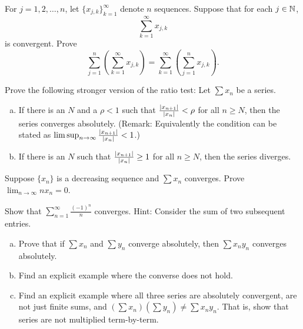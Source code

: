 \begin{exercise}
For $j=1,2,\ldots,n$, let $\{ x_{j,k} \}_{k=1}^\infty$ denote $n$
sequences.  Suppose that for each $j \in {\mathbb{N}}$,
\begin{equation*}
\sum_{k=1}^\infty x_{j,k}
\end{equation*}
is convergent.  Prove
\begin{equation*}
\sum_{j=1}^n \left( \sum_{k=1}^\infty x_{j,k} \right)
=
\sum_{k=1}^\infty \left( \sum_{j=1}^n x_{j,k} \right) .
\end{equation*}
\end{exercise}

\begin{exercise} \label{exercise:strongerratiotest}
Prove the following stronger version of the ratio test:
Let $\sum x_n$ be a series.
\begin{enumerate}[a)]
\item
If there is an $N$ and a $\rho < 1$ such that
$\frac{\left\lvert {x_{n+1}} \right\rvert}{\left\lvert {x_n} \right\rvert} < \rho$ for all $n \geq N$,
then the series converges absolutely.
(Remark: Equivalently the condition can be stated as
$\limsup_{n\to\infty} \frac{\left\lvert {x_{n+1}} \right\rvert}{\left\lvert {x_n} \right\rvert} < 1$.)
\item
If there is an $N$ such that
$\frac{\left\lvert {x_{n+1}} \right\rvert}{\left\lvert {x_n} \right\rvert} \geq 1$
for all $n \geq N$,
then the series diverges. 
\end{enumerate}
\end{exercise}

\begin{exercise}[Challenging]
Suppose $\{ x_n \}$ is a decreasing sequence and $\sum x_n$ converges.
Prove $\displaystyle \lim_{n\to\infty} n x_n = 0$.
\end{exercise}

\begin{exercise}
Show that $\displaystyle \sum_{n=1}^\infty \frac{{(-1)}^n}{n}$ converges.
Hint: Consider the sum of two subsequent entries.
\end{exercise}

\begin{exercise}
\leavevmode
\begin{enumerate}[a)]
\item Prove that if $\sum x_n$ and $\sum y_n$ converge absolutely, then
$\sum x_ny_n$ converges absolutely.
\item Find an explicit example where the converse does not hold.
\item Find an explicit example where all three series are absolutely convergent,
are not just finite sums,
and $(\sum x_n)(\sum y_n) \not= \sum x_ny_n$.  That is, show that series are
not multiplied term-by-term.
\end{enumerate}
\end{exercise}


